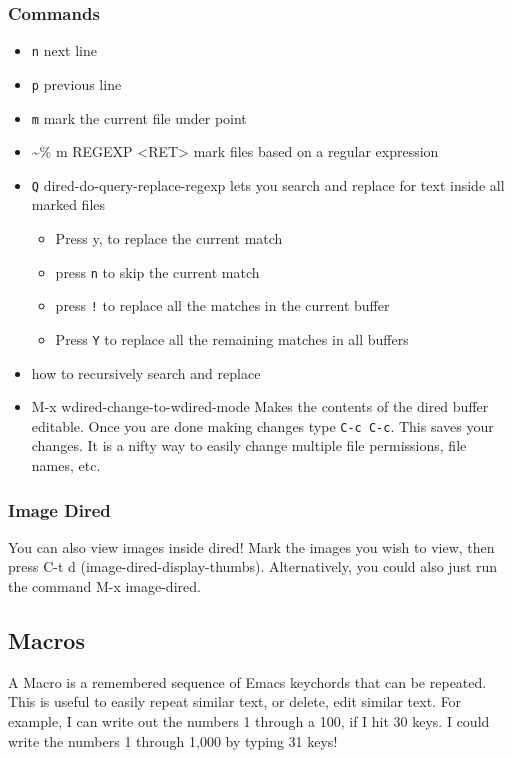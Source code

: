\documentclass[11pt]{article}
\begin{document}
\subsubsection{Commands}
\label{sec:orgheadline4}
\begin{itemize}
\item \texttt{n} next line
\item \texttt{p} previous line
\item \texttt{m} mark the current file under point
\item \textasciitilde{}\% m REGEXP <RET>  mark files based on a regular expression
\item \texttt{Q} dired-do-query-replace-regexp lets you search and replace for text inside all marked files
\begin{itemize}
\item Press y, to replace the current match
\item press \texttt{n} to skip the current match
\item press \texttt{!} to replace all the matches in the current buffer
\item Press \texttt{Y} to replace all the remaining matches in all buffers
\end{itemize}
\item how to recursively search and replace
\item M-x wdired-change-to-wdired-mode
Makes the contents of the dired buffer editable.  Once you are done making changes type \texttt{C-c C-c}.  This saves your changes.  It is a nifty way to easily change multiple file permissions, file names, etc.
\end{itemize}
\subsubsection{Image Dired}
\label{sec:orgheadline5}
You can also view images inside dired!  Mark the images you wish to view, then press C-t d (image-dired-display-thumbs). Alternatively, you could also just run the command M-x image-dired.
\subsection{Macros}
\label{sec:orgheadline7}
A Macro is a remembered sequence of Emacs keychords that can be repeated.  This is useful to easily repeat similar text, or delete, edit similar text.  For example, I can write out the numbers 1 through a 100, if I hit 30 keys.  I could write the numbers 1 through 1,000 by typing 31 keys!
\end{document}
